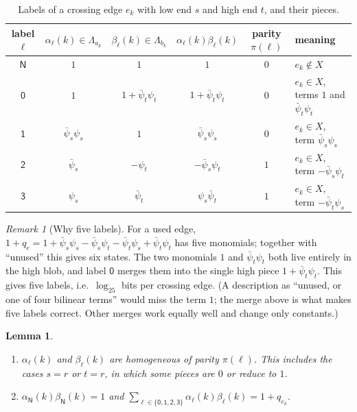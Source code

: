 \documentclass[11pt]{amsart}
\theoremstyle{plain}
\newtheorem{lemma}[theorem]{Lemma}
\theoremstyle{definition}
\theoremstyle{remark}
\newtheorem{remark}[theorem]{Remark}
\numberwithin{equation}{section}
\newcommand{\bpsi}{\bar\psi}
\newcommand{\lab}[1]{\mathsf{#1}}
\begin{document}
\begin{table}[ht]
\centering
\caption{Labels of a crossing edge $e_k$ with low end $s$ and high end $t$, and their pieces.}
\label{tab:labels}
\begin{tabular}{@{}cccccl@{}}
\toprule
label $\ell$ & $\alpha_\ell(k)\in\Lambda_{a_k}$ & $\beta_\ell(k)\in\Lambda_{b_k}$ & $\alpha_\ell(k)\beta_\ell(k)$ & parity $\pi(\ell)$ & meaning \\
\midrule
$\lab N$ & $1$ & $1$ & $1$ & $0$ & $e_k\notin X$\\
$\lab 0$ & $1$ & $1+\bpsi_t\psi_t$ & $1+\bpsi_t\psi_t$ & $0$ & $e_k\in X$, terms $1$ and $\bpsi_t\psi_t$\\
$\lab 1$ & $\bpsi_s\psi_s$ & $1$ & $\bpsi_s\psi_s$ & $0$ & $e_k\in X$, term $\bpsi_s\psi_s$\\
$\lab 2$ & $\bpsi_s$ & $-\psi_t$ & $-\bpsi_s\psi_t$ & $1$ & $e_k\in X$, term $-\bpsi_s\psi_t$\\
$\lab 3$ & $\psi_s$ & $\bpsi_t$ & $\psi_s\bpsi_t$ & $1$ & $e_k\in X$, term $-\bpsi_t\psi_s$\\
\bottomrule
\end{tabular}
\end{table}

\begin{remark}[Why five labels]\label{rem:five-labels}
For a used edge, $1+q_e=1+\bpsi_s\psi_s-\bpsi_s\psi_t-\bpsi_t\psi_s+\bpsi_t\psi_t$ has five
monomials; together with ``unused'' this gives six states. The two monomials $1$ and
$\bpsi_t\psi_t$ both live entirely in the high blob, and label $\lab 0$ merges them into the
single high piece $1+\bpsi_t\psi_t$. This gives five labels, i.e.\ $\log_25$ bits per crossing
edge. (A description as ``unused, or one of four bilinear terms'' would miss the term $1$; the
merge above is what makes five labels correct. Other merges work equally well and change only
constants.)
\end{remark}

\begin{lemma}\label{lem:pieces}
\leavevmode
\begin{enumerate}[label=\textup{(\alph*)}]
\item $\alpha_\ell(k)$ and $\beta_\ell(k)$ are homogeneous of parity $\pi(\ell)$. This includes
the cases $s=r$ or $t=r$, in which some pieces are $0$ or reduce to $1$.
\item $\alpha_{\lab N}(k)\beta_{\lab N}(k)=1$ and
$\sum_{\ell\in\{\lab0,\lab1,\lab2,\lab3\}}\alpha_\ell(k)\beta_\ell(k)=1+q_{e_k}$.
\end{enumerate}
\end{lemma}
\end{document}
